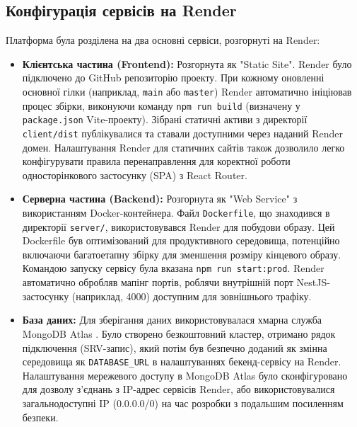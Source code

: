 \subsection{Конфігурація сервісів на Render}
Платформа була розділена на два основні сервіси, розгорнуті на Render:
\begin{itemize}
    \item \textbf{Клієнтська частина (Frontend):} Розгорнута як "Static Site". Render було підключено до GitHub репозиторію проекту. При кожному оновленні основної гілки (наприклад, \texttt{main} або \texttt{master}) Render автоматично ініціював процес збірки, виконуючи команду \texttt{npm run build} (визначену у \texttt{package.json} Vite-проекту). Зібрані статичні активи з директорії \texttt{client/dist} публікувалися та ставали доступними через наданий Render домен. Налаштування Render для статичних сайтів також дозволило легко конфігурувати правила перенаправлення для коректної роботи односторінкового застосунку (SPA) з React Router.
    \item \textbf{Серверна частина (Backend):} Розгорнута як "Web Service" з використанням Docker-контейнера. Файл \texttt{Dockerfile}, що знаходився в директорії \texttt{server/}, використовувався Render для побудови образу. Цей Dockerfile був оптимізований для продуктивного середовища, потенційно включаючи багатоетапну збірку для зменшення розміру кінцевого образу. Командою запуску сервісу була вказана \texttt{npm run start:prod}. Render автоматично обробляв мапінг портів, роблячи внутрішній порт NestJS-застосунку (наприклад, 4000) доступним для зовнішнього трафіку.
    \item \textbf{База даних:} Для зберігання даних використовувалася хмарна служба MongoDB Atlas \cite{mongodb}. Було створено безкоштовний кластер, отримано рядок підключення (SRV-запис), який потім був безпечно доданий як змінна середовища як \texttt{DATABASE\_URL} в налаштуваннях бекенд-сервісу на Render. Налаштування мережевого доступу в MongoDB Atlas було сконфігуровано для дозволу з'єднань з IP-адрес сервісів Render, або використовувалися загальнодоступні IP (0.0.0.0/0) на час розробки з подальшим посиленням безпеки.
\end{itemize}

